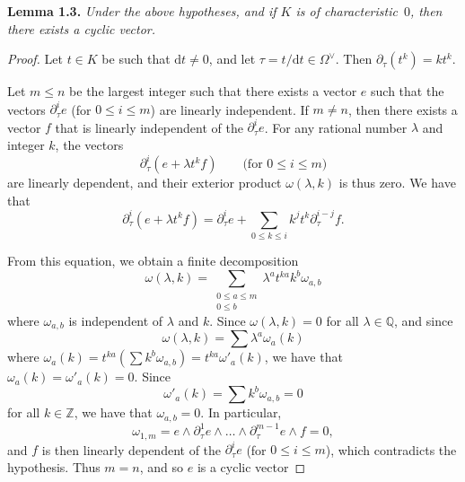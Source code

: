 \documentclass{report}
\newenvironment{itenv}[1]
  {\phantomsection\par\medskip\noindent\textbf{#1.}\itshape}
  {\par\medskip}
\newcommand{\QQ}{\mathbb{Q}}
\newcommand{\ZZ}{\mathbb{Z}}
\newcommand{\dd}{\mathrm{d}}
\renewcommand{\leq}{\leqslant}
\newcommand{\oldpage}[1]{\marginpar{\footnotesize$\Big\vert$ \textit{p.~#1}}}
\begin{document}
\begin{itenv}{Lemma 1.3}
\label{II.1.3}
  Under the above hypotheses, and if $K$ is of characteristic~$0$, then there exists a cyclic vector.
\end{itenv}

\begin{proof}
  Let $t\in K$ be such that $\dd t\neq0$, and let $\tau=t/\dd t\in\Omega^\vee$.
  Then $\partial_\tau(t^k)=kt^k$.

  Let $m\leq n$ be the largest integer such that there exists a vector $e$ such that the vectors $\partial_\tau^i e$ (for $0\leq i\leq m$) are linearly independent.
  If $m\neq n$, then there exists a vector $f$ that is linearly independent of the $\partial_\tau^i e$.
  For any rational number $\lambda$ and integer $k$, the vectors
  \[
    \partial_\tau^i(e+\lambda t^k f)
    \qquad\mbox{(for $0\leq i\leq m$)}
  \]
  are linearly dependent, and their exterior product $\omega(\lambda,k)$ is thus zero.
  We have that
  \[
    \partial_\tau^i(e+\lambda t^k f)
    = \partial_\tau^i e + \sum_{0\leq k\leq i} k^j t^k \partial_\tau^{i-j} f.
  \]

  From this equation, we obtain a finite decomposition
  \[
    \omega(\lambda,k)
    = \sum_{\substack{0\leq a\leq m\\0\leq b}} \lambda^a t^{ka} k^b \omega_{a,b}
  \]
\oldpage{43}
  where $\omega_{a,b}$ is independent of $\lambda$ and $k$.
  Since $\omega(\lambda,k)=0$ for all $\lambda\in\QQ$, and since
  \[
    \omega(\lambda,k) = \sum \lambda^a \omega_a(k)
  \]
  where $\omega_a(k) = t^{ka}(\sum k^b \omega_{a,b}) = t^{ka} \omega'_a(k)$, we have that $\omega_a(k) = \omega'_a(k) = 0$.
  Since
  \[
    \omega'_a(k) = \sum k^b \omega_{a,b} = 0
  \]
  for all $k\in\ZZ$, we have that $\omega_{a,b}=0$.
  In particular,
  \[
    \omega_{1,m}
    = e\wedge\partial_\tau^1 e\wedge\ldots\wedge\partial_\tau^{m-1} e\wedge f
    = 0,
  \]
  and $f$ is then linearly dependent of the $\partial_\tau^i e$ (for $0\leq i\leq m$), which contradicts the hypothesis.
  Thus $m=n$, and so $e$ is a cyclic vector
\end{proof}
\end{document}

